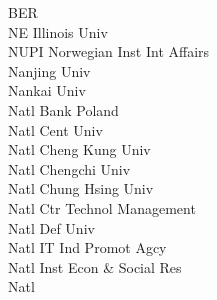 \documentclass[a4paper]{article}
\begin{document}
\begin{multicols*}{2}
\begin{footnotesize}
BER \\ NE Illinois Univ \\ NUPI Norwegian Inst Int Affairs \\ Nanjing Univ \\ Nankai Univ \\ Natl Bank Poland \\ Natl Cent Univ \\ Natl Cheng Kung Univ \\ Natl Chengchi Univ \\ Natl Chung Hsing Univ \\ Natl Ctr Technol Management \\ Natl Def Univ \\ Natl IT Ind Promot Agcy \\ Natl Inst Econ \& Social Res \\ Natl
\end{footnotesize}
\end{multicols*}
\end{document}
